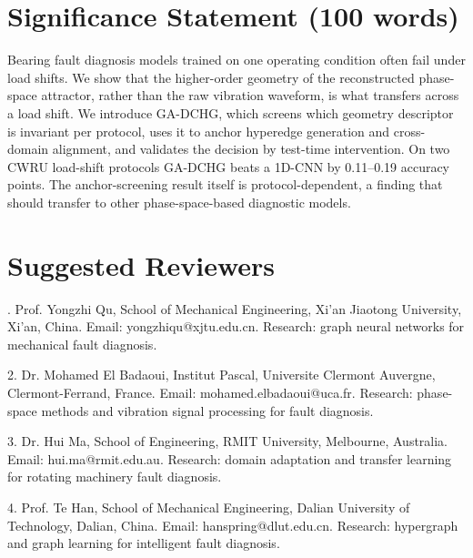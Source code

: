 
\section*{Significance Statement (100 words)}
\noindent
Bearing fault diagnosis models trained on one operating condition often fail under load shifts. We show that the higher-order geometry of the reconstructed phase-space attractor, rather than the raw vibration waveform, is what transfers across a load shift. We introduce GA-DCHG, which screens which geometry descriptor is invariant per protocol, uses it to anchor hyperedge generation and cross-domain alignment, and validates the decision by test-time intervention. On two CWRU load-shift protocols GA-DCHG beats a 1D-CNN by 0.11--0.19 accuracy points. The anchor-screening result itself is protocol-dependent, a finding that should transfer to other phase-space-based diagnostic models.

\section*{Suggested Reviewers}
. Prof. Yongzhi Qu, School of Mechanical Engineering, Xi'an Jiaotong University, Xi'an, China. Email: yongzhiqu@xjtu.edu.cn. Research: graph neural networks for mechanical fault diagnosis.

2. Dr. Mohamed El Badaoui, Institut Pascal, Universite Clermont Auvergne, Clermont-Ferrand, France. Email: mohamed.elbadaoui@uca.fr. Research: phase-space methods and vibration signal processing for fault diagnosis.

3. Dr. Hui Ma, School of Engineering, RMIT University, Melbourne, Australia. Email: hui.ma@rmit.edu.au. Research: domain adaptation and transfer learning for rotating machinery fault diagnosis.

4. Prof. Te Han, School of Mechanical Engineering, Dalian University of Technology, Dalian, China. Email: hanspring@dlut.edu.cn. Research: hypergraph and graph learning for intelligent fault diagnosis.
